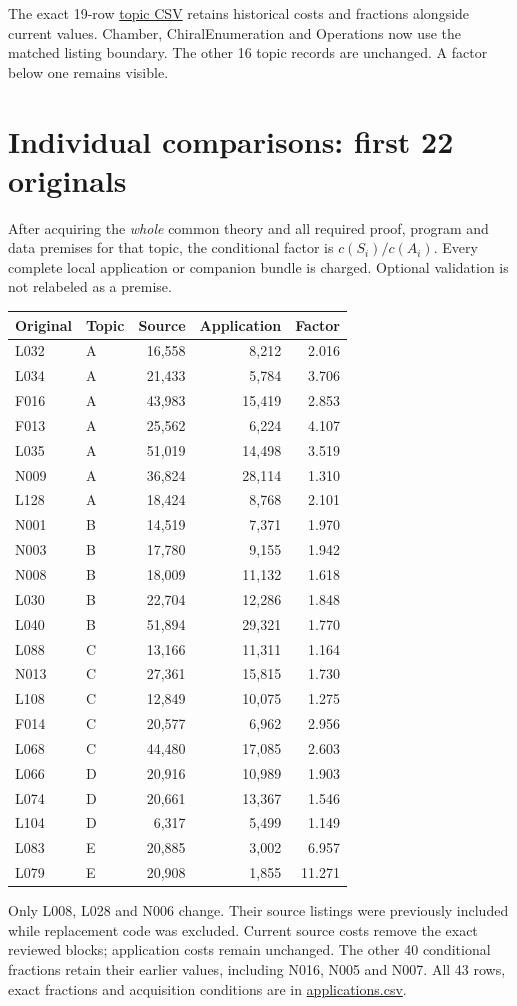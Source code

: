 \documentclass[11pt,a4paper]{article}
\begin{document}
The exact 19-row \href{topics.csv}{topic CSV} retains historical costs and fractions alongside current values. Chamber, ChiralEnumeration and Operations now use the matched listing boundary. The other 16 topic records are unchanged. A factor below one remains visible.
\newpage
\section*{Individual comparisons: first 22 originals}
After acquiring the \emph{whole} common theory and all required proof, program and data premises for that topic, the conditional factor is $c(S_i)/c(A_i)$. Every complete local application or companion bundle is charged. Optional validation is not relabeled as a premise.
\begin{center}\small\begin{tabular}{llrrr}\toprule
Original & Topic & Source & Application & Factor\\\midrule
L032 & A & 16,558 & 8,212 & 2.016 \\
L034 & A & 21,433 & 5,784 & 3.706 \\
F016 & A & 43,983 & 15,419 & 2.853 \\
F013 & A & 25,562 & 6,224 & 4.107 \\
L035 & A & 51,019 & 14,498 & 3.519 \\
N009 & A & 36,824 & 28,114 & 1.310 \\
L128 & A & 18,424 & 8,768 & 2.101 \\
N001 & B & 14,519 & 7,371 & 1.970 \\
N003 & B & 17,780 & 9,155 & 1.942 \\
N008 & B & 18,009 & 11,132 & 1.618 \\
L030 & B & 22,704 & 12,286 & 1.848 \\
L040 & B & 51,894 & 29,321 & 1.770 \\
L088 & C & 13,166 & 11,311 & 1.164 \\
N013 & C & 27,361 & 15,815 & 1.730 \\
L108 & C & 12,849 & 10,075 & 1.275 \\
F014 & C & 20,577 & 6,962 & 2.956 \\
L068 & C & 44,480 & 17,085 & 2.603 \\
L066 & D & 20,916 & 10,989 & 1.903 \\
L074 & D & 20,661 & 13,367 & 1.546 \\
L104 & D & 6,317 & 5,499 & 1.149 \\
L083 & E & 20,885 & 3,002 & 6.957 \\
L079 & E & 20,908 & 1,855 & 11.271 \\\bottomrule\end{tabular}\end{center}
Only L008, L028 and N006 change. Their source listings were previously included while replacement code was excluded. Current source costs remove the exact reviewed blocks; application costs remain unchanged. The other 40 conditional fractions retain their earlier values, including N016, N005 and N007. All 43 rows, exact fractions and acquisition conditions are in \href{applications.csv}{applications.csv}.
\end{document}
